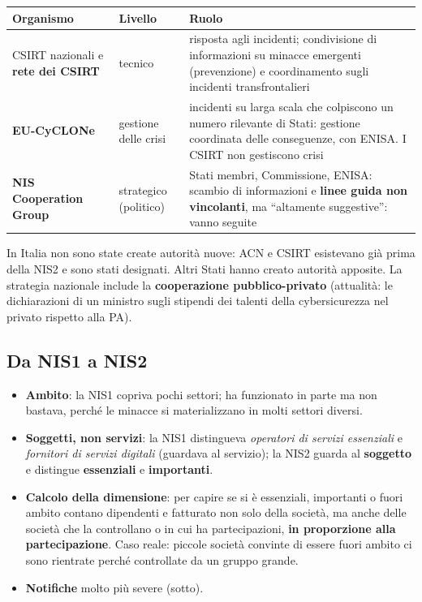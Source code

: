 \begin{center}
\small
\begin{tabularx}{\linewidth}{>{\raggedright\arraybackslash}p{3.4cm} >{\raggedright\arraybackslash}p{2.6cm} X}
\toprule
\textbf{Organismo} & \textbf{Livello} & \textbf{Ruolo}\\
\midrule
CSIRT nazionali e \textbf{rete dei CSIRT} & tecnico & risposta agli incidenti; condivisione di
  informazioni su minacce emergenti (prevenzione) e coordinamento sugli incidenti transfrontalieri\\
\textbf{EU-CyCLONe} & gestione delle crisi & incidenti su larga scala che colpiscono un numero
  rilevante di Stati: gestione coordinata delle conseguenze, con ENISA. I CSIRT non gestiscono
  crisi\\
\textbf{NIS Cooperation Group} & strategico (politico) & Stati membri, Commissione, ENISA: scambio di
  informazioni e \textbf{linee guida non vincolanti}, ma ``altamente suggestive'': vanno seguite\\
\bottomrule
\end{tabularx}
\end{center}
In Italia non sono state create autorità nuove: ACN e CSIRT esistevano già prima della NIS2 e sono
stati designati. Altri Stati hanno creato autorità apposite. La strategia nazionale include la
\textbf{cooperazione pubblico-privato} (attualità: le dichiarazioni di un ministro sugli stipendi dei
talenti della cybersicurezza nel privato rispetto alla PA).

\subsection{Da NIS1 a NIS2}
\begin{itemize}
  \item \textbf{Ambito}: la NIS1 copriva pochi settori; ha funzionato in parte ma non bastava, perché
    le minacce si materializzano in molti settori diversi.
  \item \textbf{Soggetti, non servizi}: la NIS1 distingueva \emph{operatori di servizi essenziali} e
    \emph{fornitori di servizi digitali} (guardava al servizio); la NIS2 guarda al \textbf{soggetto} e
    distingue \textbf{essenziali} e \textbf{importanti}.
  \item \textbf{Calcolo della dimensione}: per capire se si è essenziali, importanti o fuori ambito
    contano dipendenti e fatturato non solo della società, ma anche delle società che la
    controllano o in cui ha partecipazioni, \textbf{in proporzione alla partecipazione}. Caso reale:
    piccole società convinte di essere fuori ambito ci sono rientrate perché controllate da un gruppo
    grande.
  \item \textbf{Notifiche} molto più severe (sotto).
\end{itemize}

